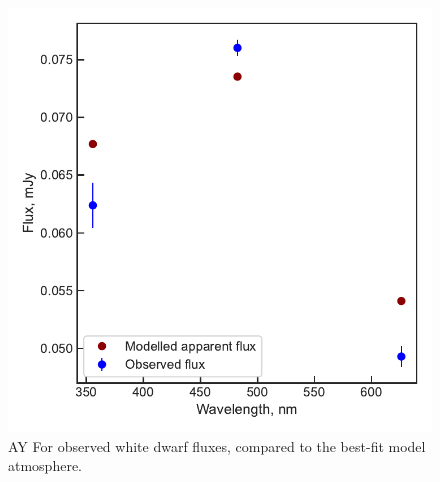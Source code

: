 \begin{figure}
    \centering
    \includegraphics[width=\textwidth]{figures/results/AYFor/fluxplot.pdf}
    \caption{AY For observed white dwarf fluxes, compared to the best-fit model atmosphere.}
    \label{fig:AYFor flux plot}
\end{figure}
\clearpage


